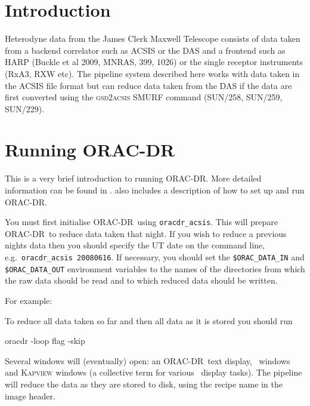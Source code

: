 \documentclass[twoside,11pt,nolof]{starlink}
\providecommand{\GAIA}{\xref{{\sc{Gaia}}}{sun214}{}}
\providecommand{\KAPPA}{\xref{{\sc{Kappa}}}{sun95}{}}
\providecommand{\ORACDR}{{\footnotesize ORAC-DR}}
\begin{document}
\scfrontmatter

\section{Introduction}

Heterodyne data from the James Clerk Maxwell Telescope consists
of data taken from a backend correlator such as ACSIS or the DAS and
a frontend such as HARP (Buckle et al 2009, MNRAS, 399, 1026)
or the single receptor instruments (RxA3, RXW etc). The pipeline system
described here works with data taken in the ACSIS file format but
can reduce data taken from the DAS if the data are first converted
using the \textsc{gsd2acsis} SMURF command (SUN/258, SUN/259, SUN/229).


\section{Running ORAC-DR}

This is a very brief introduction to running \ORACDR. More detailed
information can be found in .
 also includes a description of how to set up
and run \ORACDR.

You must first initialise \ORACDR\ using \texttt{oracdr\_acsis}. This will
prepare \ORACDR\ to reduce data taken that night. If
you wish to reduce a previous nights data then you should specify the
UT date on the command line, e.g.\ \texttt{oracdr\_acsis 20080616}. If
necessary, you should set the \texttt{\$ORAC\_DATA\_IN} and \texttt{\$ORAC\_DATA\_OUT} environment variables to the names of the
directories from which the raw data should be read and to which reduced
data should be written.

For example:

\begin{terminalv}
\end{terminalv}

To reduce all data taken so far and then all data as it is stored you
should run

\begin{terminalv}
      oracdr -loop flag -skip
\end{terminalv}

Several windows will (eventually) open: an \ORACDR\ text display, \GAIA\
windows and \textsc{Kapview} windows (a collective term for various
\KAPPA\ display tasks). The pipeline will reduce the data as they
are stored to disk, using the recipe name in the image header.
\end{document}
